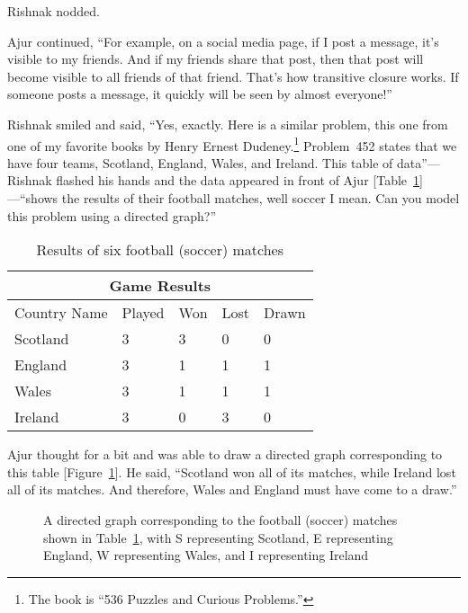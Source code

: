 Rishnak nodded.

Ajur continued, ``For example, on a social media page, if I post a message, it's visible to my friends. And if my friends share that post, then that post will become visible to all friends of that friend. That's how transitive closure works. If someone posts a message, it quickly will be seen
by almost everyone!''

Rishnak smiled and said, ``Yes, exactly. Here is a similar problem, this one from one of my favorite books by Henry Ernest Dudeney.\footnote{The book is ``536 Puzzles and Curious Problems.''} Problem~452 states that we have four teams, Scotland, England, Wales, and Ireland. This table of data''---Rishnak flashed his hands and the data appeared in front of Ajur [Table~\ref{15t1}]---``shows the results of their football matches, well soccer I mean. Can you model this problem using a directed graph?''

\begin{table}
\begin{center}
\begin{tabular}{ |p{3cm}||p{1.5cm}||p{1.5cm}||p{1.5cm}||p{1.5cm}||  }
 \hline
 \multicolumn{5}{|c|}{Game Results} \\
 \hline
 Country Name & Played & Won & Lost & Drawn \\
 \hline
 Scotland & 3 & 3 & 0 & 0 \\
 England  & 3 & 1 & 1 & 1 \\
 Wales    & 3 & 1 & 1 & 1 \\
 Ireland  & 3 & 0 & 3 & 0 \\
  \hline
\end{tabular}
\caption{Results of six football (soccer) matches}\label{15t1}
\end{center}
\end{table}

Ajur thought for a bit and was able to draw a directed graph corresponding to this table [Figure~\ref{15g33}]. He said, ``Scotland won all of its matches, while Ireland lost all of its matches. And therefore, Wales and England must have come to a draw.''

\begin{figure}
\begin{center}
\caption{A directed graph corresponding to the football (soccer) matches shown in Table~\ref{15t1}, with S representing Scotland, E representing England, W representing Wales, and I representing Ireland}\label{15g33}
\end{center}
\end{figure}

